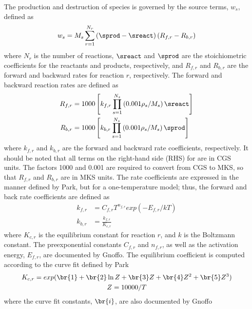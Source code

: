 The production and destruction of species is governed by the source terms,
$w_s$, defined as
\begin{equation}
  w_s = M_s \sum_{r=1}^{N_r}\left( \sprod - \sreact \right)
        \left( R_{f,r} - R_{b,r} \right)
  \label{source-term}
\end{equation}
where $N_r$ is the number of reactions, $\sreact$ and $\sprod$ are the
stoichiometric coefficients for the reactants and products, respectively, and
$R_{f,r}$ and $R_{b,r}$ are the forward and backward rates for reaction
$r$, respectively.  The forward and backward reaction rates are defined as
\begin{align}
  R_{f,r} &= 1000\left[ k_{f,r}\prod_{s=1}^{N_s}\left( 0.001\rho_s/M_s
  \right)\sreact \right] \label{forward-rate} \\
  R_{b,r} &= 1000\left[ k_{b,r}\prod_{s=1}^{N_s}\left( 0.001\rho_s/M_s
  \right)\sprod \right]
  \label{backward-rate}
\end{align}
where $k_{f,r}$ and $k_{b,r}$ are the forward and backward rate coefficients,
respectively.  It should be noted that all terms on the right-hand side (RHS)
for  are in CGS units.  The factors 1000 and
0.001 are required to convert from CGS to MKS, so that $R_{f,r}$ and $R_{b,r}$
are in MKS units.  The rate coefficients are expressed in the manner defined by
Park\cite{park}, but for a one-temperature model; thus, the forward and back
rate coefficients are defined as
\begin{align}
  k_{f,r} &= C_{f,r}T^{n_{f,r}}exp\left( -E_{f,r}/kT \right)
  \label{forward-rate-coef} \\
  k_{b,r} &= \frac{k_{f,r}}{K_{c,r}}
  \label{backward-rate-coef}
\end{align}
where $K_{c,r}$ is the equilibrium constant for reaction $r$, and $k$ is the
Boltzmann constant.  The preexponential constants $C_{f,r}$ and $n_{f,r}$, as
well as the activation energy, $E_{f,r}$, are documented by
Gnoffo\cite{gnoffo-tp}.  The equilibrium coefficient is computed according to
the curve fit defined by Park\cite{park1985convergence}
\begin{gather}
  K_{c,r} = exp(\br{1} + \br{2}\ln{Z} + \br{3}Z + \br{4}Z^2 + \br{5}Z^3) \\
  Z = 10000/T
\end{gather}
where the curve fit constants, $\br{i}$, are also documented by
Gnoffo\cite{gnoffo-tp}
